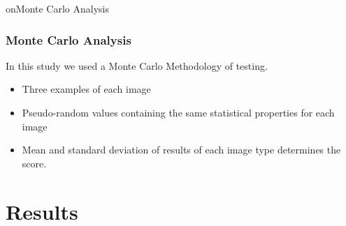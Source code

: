 \documentclass[9pt]{beamer}
\begin{document}
on{Monte Carlo Analysis}

		\begin{frame}
				\frametitle{Monte Carlo Analysis}
			 			In this study we used a Monte Carlo Methodology of testing.
			 			\begin{itemize}
			 			\item Three examples of each image
			 			\item Pseudo-random values containing the same statistical properties for each image 
			 			\item Mean and standard deviation of results of each image type determines the score.
			 			\end{itemize}
	\end{frame}

\section{Results}
\end{document}
